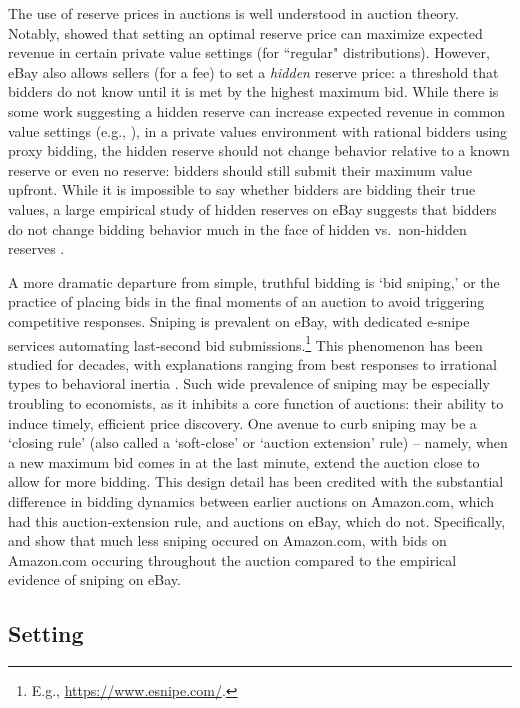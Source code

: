 \documentclass{article} %
\begin{document}
The use of reserve prices in auctions is well understood in auction theory. Notably, 
\citet{myerson1981optimal} showed that setting an optimal reserve price can maximize expected revenue in certain
private value settings (for ``regular" distributions).
However, eBay also allows sellers (for a fee) to set a {\em hidden} reserve price: a threshold that bidders do not know until it is met by the highest maximum bid. 
%
While there is some work suggesting a hidden reserve can increase expected revenue in common value settings (e.g., \citet{vincent1995bidding}), in a private values environment with rational bidders using proxy bidding, the hidden reserve should not change behavior relative to a known reserve or even no reserve: bidders should still submit their maximum value upfront. While it is impossible to say whether bidders are bidding their true values, a large empirical study of hidden reserves on eBay suggests that bidders do not change bidding behavior much in the face of hidden vs.~non-hidden reserves \citep{einav2011learning}. 

A more dramatic departure from simple, truthful bidding is `bid sniping,' or the practice of placing bids in the final moments of an auction to avoid triggering competitive responses.
Sniping is prevalent on eBay, with dedicated e-snipe services automating last-second bid submissions.\footnote{E.g., \url{https://www.esnipe.com/}.} This phenomenon has been studied for decades, with explanations ranging from best responses to irrational types to behavioral inertia \citep{roth2002last}. Such wide prevalence of sniping may be especially troubling to economists, as it inhibits a core function of auctions: their ability to induce timely, efficient price discovery. One avenue to curb sniping may be a `closing rule' (also called a `soft-close' or `auction extension' rule) -- namely, when a new maximum bid comes in at the last minute, extend the auction close to allow for more bidding. This design detail has been credited with the substantial difference in bidding dynamics between earlier auctions on Amazon.com, which had this auction-extension rule, and auctions on eBay, which do not. Specifically, \citet{roth2002last} and \citet{ockenfels2006late} show that much less sniping occured on Amazon.com, with bids on Amazon.com occuring throughout the auction compared to the empirical evidence of sniping on eBay. 

\subsection{Setting}
\end{document}
